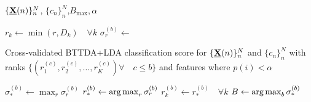 \begin{algorithmic}[1]
  \Require $\{\underline{\mathbf{X}}(n)\}_n^N$, $\{c_n\}_n^N$,$B_\text{max}, \alpha$

  \State $r_k \gets \min(r, D_k) \quad \forall k$
  \State $\sigma^{(b)}_r \gets$ \parbox[t]{5cm}{%
    \raggedright
    Cross-validated BTTDA+LDA classification
    score for $\{\underline{\mathbf{X}}(n)\}_n^N$ and $\{c_n\}_n^N$ with ranks
    $\{(r_1^{(c)},r_2^{(c)},\ldots,r_K^{(c)}) \forall\quad
    c\leq b\}$ and features where $p(i)<\alpha$
  }
  \EndFor
  \State $\textstyle{\sigma^{(b)}_* \gets \max_r\sigma^{(b)}_r}$
  \State $\textstyle{r^{(b)}_* \gets \operatorname*{arg\,max}_r\sigma^{(b)}_r}$
  \State $r_k^{(b)}\gets r^{(b)}_*\quad\forall k$
  \EndFor
  \State $\textstyle{B\gets\operatorname*{arg\,max}_b\sigma^{(b)}_*}$
\end{algorithmic}
